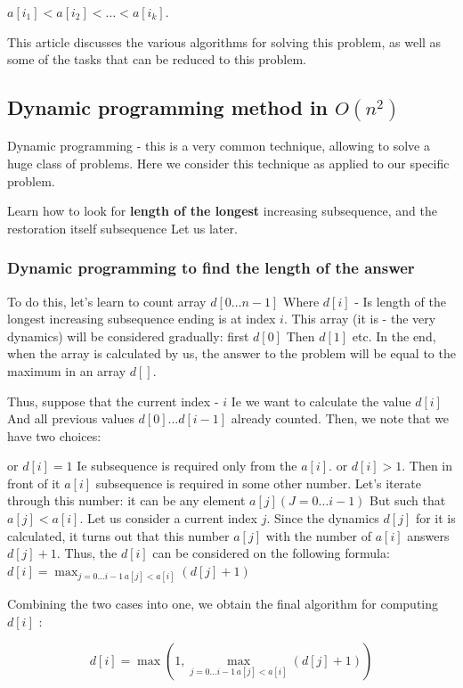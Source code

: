 $a [i_1] <a [i_2] <\ldots <a [i_k].$

This article discusses the various algorithms for solving this problem, as well as some of the tasks that can be reduced to this problem.

\subsection{ Dynamic programming method in $O (n ^ 2)$ }

Dynamic programming - this is a very common technique, allowing to solve a huge class of problems. Here we consider this technique as applied to our specific problem.

Learn how to look for \textbf{length of the longest} increasing subsequence, and the restoration itself subsequence Let us later.

\subsubsection{ Dynamic programming to find the length of the answer }

To do this, let's learn to count array $d [0 \ldots n-1]$ Where $d [i]$ - Is length of the longest increasing subsequence ending is at index $i$. This array (it is - the very dynamics) will be considered gradually: first $d [0]$ Then $d [1]$ etc. In the end, when the array is calculated by us, the answer to the problem will be equal to the maximum in an array $d []$.

Thus, suppose that the current index - $i$ Ie we want to calculate the value $d [i]$ And all previous values $d [0] \ldots d [i-1]$ already counted. Then, we note that we have two choices:

or $d [i] = 1$ Ie subsequence is required only from the $a [i]$.
or $d [i]> 1$. Then in front of it $a [i]$ subsequence is required in some other number. Let's iterate through this number: it can be any element $a [j]$$(J = 0 \ldots i-1)$ But such that $a [j] <a [i]$. Let us consider a current index $j$. Since the dynamics $d [j]$ for it is calculated, it turns out that this number $a [j]$ with the number of $a [i]$ answers $d [j] + 1$. Thus, the $d [i]$ can be considered on the following formula:
$d[i]=\max_{j=0\ldots i-1\, a[j]<a[i]}(d[j]+1)$

Combining the two cases into one, we obtain the final algorithm for computing $d [i]$ :

$$d[i]=\max\left(1,\max_{j=0\ldots i-1\, a[j]<a[i]}(d[j]+1)\right)$$

